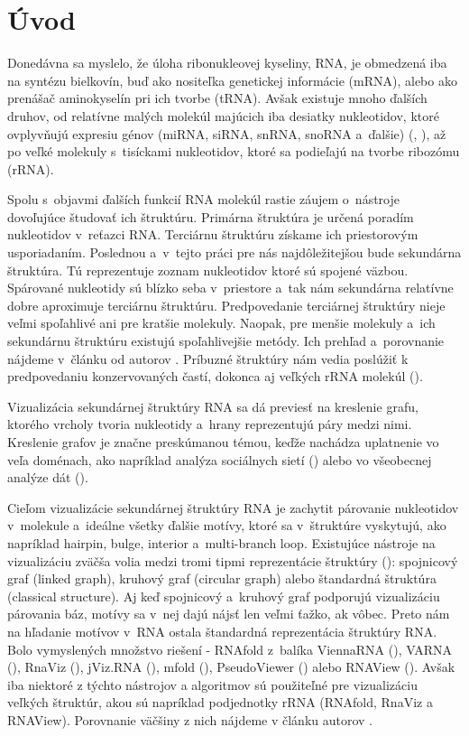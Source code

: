 
\chapter*{Úvod}

Donedávna sa myslelo, že úloha ribonukleovej kyseliny, RNA, je obmedzená
iba na syntézu bielkovín, buď ako nositeľka genetickej informácie (mRNA),
alebo ako prenášač aminokyselín pri ich tvorbe (tRNA).
Avšak existuje mnoho ďalších druhov, od relatívne malých molekúl majúcich
iba desiatky nukleotidov, ktoré ovplyvňujú expresiu génov
(miRNA, siRNA, snRNA, snoRNA a~ďalšie) (\citet{RNA_MI_SI}, \citet{RNA_SN_SNO}),
až po veľké molekuly s~tisíckami nukleotidov, ktoré sa podieľajú na tvorbe ribozómu (rRNA).

Spolu s~objavmi ďalších funkcií RNA molekúl rastie záujem o~nástroje dovoľujúce
študovať ich štruktúru.
Primárna štruktúra je určená poradím nukleotidov v~reťazci RNA.
Terciárnu štruktúru získame ich priestorovým usporiadaním.
Poslednou a~v~tejto práci pre nás najdôležitejšou
bude sekundárna štruktúra. Tú reprezentuje zoznam nukleotidov ktoré sú spojené väzbou.
Spárované nukleotidy sú blízko seba v~priestore a~tak nám sekundárna relatívne
dobre aproximuje terciárnu štruktúru. Predpovedanie terciárnej štruktúry nieje veľmi
spoľahlivé ani pre kratšie molekuly. Naopak, pre menšie molekuly a~ich  sekundárnu
štruktúru existujú spoľahlivejšie metódy. Ich prehľad a~porovnanie nájdeme v~článku
od autorov \citet{SEC_STR_PREDICT_TOOLS}.
Príbuzné štruktúry nám vedia poslúžiť k predpovedaniu konzervovaných častí, dokonca
aj veľkých rRNA molekúl (\citet{SEC_STR_PREDICTION}).

Vizualizácia sekundárnej štruktúry RNA sa dá previesť na kreslenie grafu,
ktorého vrcholy tvoria nukleotidy a~hrany reprezentujú páry medzi nimi.
Kreslenie grafov je značne preskúmanou témou, keďže nachádza uplatnenie vo veľa
doménach, ako napríklad analýza sociálnych sietí (\citet{SOCIAL_NETWORK_ANALYSIS})
alebo vo všeobecnej analýze dát (\citet{GRAPH_DRAWING}).

Cieľom vizualizácie sekundárnej štruktúry RNA je zachytit párovanie nukleotidov
v~molekule a~ideálne všetky ďalšie motívy, ktoré sa v~štruktúre vyskytujú,
ako napríklad hairpin, bulge, interior a~multi-branch loop.
Existujúce nástroje na vizualizáciu zväčša volia medzi tromi tipmi reprezentácie
štruktúry (\citet{JVIZ}): spojnicový graf (linked graph), kruhový graf (circular graph)
alebo štandardná štruktúra (classical structure).
Aj keď spojnicový a~kruhový graf podporujú vizualizáciu párovania báz, motívy
sa v~nej dajú nájsť len veľmi ťažko, ak vôbec.
Preto nám na hľadanie motívov v~RNA ostala štandardná reprezentácia štruktúry RNA.
Bolo vymyslených množstvo riešení -
RNAfold z~balíka ViennaRNA (\citet{VIENNA_RNA}), VARNA (\citet{VARNA}),
RnaViz (\citet{RNA_VIZ}), jViz.RNA (\citet{JVIZ}), mfold (\citet{MFOLD}),
PseudoViewer (\citet{PSEUDOVIEWER}) alebo RNAView (\citet{RNAVIEW}).
Avšak iba niektoré z týchto nástrojov a algoritmov sú použiteľné pre vizualizáciu
veľkých štruktúr, akou sú napríklad podjednotky rRNA (RNAfold, RnaViz a RNAView).
Porovnanie väčšiny z nich nájdeme v článku autorov \citet{DRAWING_COMPARISION}.

